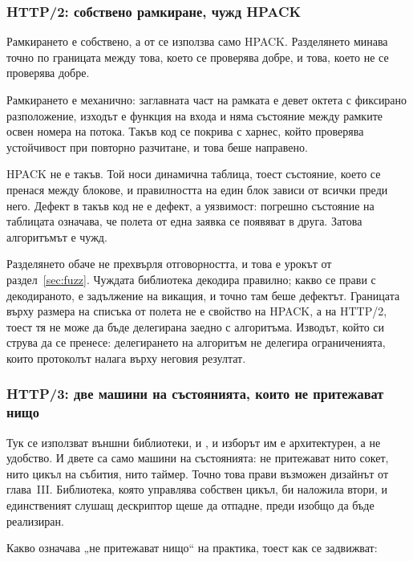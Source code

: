 \subsubsection{HTTP/2: собствено рамкиране, чужд HPACK}

Рамкирането е собствено, а от  \cite{nghttp2} се използва само HPACK.
Разделянето минава точно по границата между това, което се проверява добре, и това, което не
се проверява добре.

Рамкирането е механично: заглавната част на рамката е девет октета с фиксирано разположение,
изходът е функция на входа и няма състояние между рамките освен номера на потока. Такъв код
се покрива с харнес, който проверява устойчивост при повторно разчитане, и това беше
направено.

HPACK не е такъв. Той носи динамична таблица, тоест състояние, което се пренася между
блокове, и правилността на един блок зависи от всички преди него. Дефект в такъв код не е
дефект, а уязвимост: погрешно състояние на таблицата означава, че полета от една заявка се
появяват в друга. Затова алгоритъмът е чужд.

Разделянето обаче не прехвърля отговорността, и това е урокът от раздел~\ref{sec:fuzz}.
Чуждата библиотека декодира правилно; какво се прави с декодираното, е задължение на викащия,
и точно там беше дефектът. Границата върху размера на списъка от полета не е свойство на
HPACK, а на HTTP/2, тоест тя не може да бъде делегирана заедно с алгоритъма. Изводът, който
си струва да се пренесе: делегирането на алгоритъм не делегира ограниченията, които
протоколът налага върху неговия резултат.

\subsubsection{HTTP/3: две машини на състоянията, които не притежават нищо}

Тук се използват външни библиотеки,  и , и изборът им е
архитектурен, а не удобство. И двете са само машини на състоянията: не притежават нито сокет,
нито цикъл на събития, нито таймер. Точно това прави възможен дизайнът от глава~III.
Библиотека, която управлява собствен цикъл, би наложила втори, и единственият слушащ
дескриптор щеше да отпадне, преди изобщо да бъде реализиран.

Какво означава „не притежават нищо“ на практика, тоест как се задвижват:

